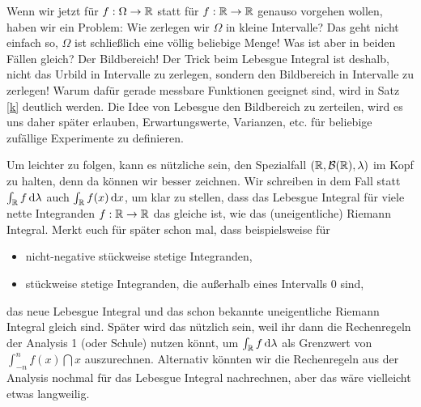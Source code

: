 Wenn wir jetzt f\"ur $f:\Omega\to \mathbb{R}$ statt für $f:\mathbb{R}\to \mathbb{R}$ genauso vorgehen wollen, haben wir ein Problem: Wie zerlegen wir $\Omega$ in kleine Intervalle? Das geht nicht einfach so, $\Omega$ ist schlie\ss lich eine v\"ollig beliebige Menge! Was ist aber in beiden F\"allen gleich? Der Bildbereich! Der Trick beim Lebesgue Integral ist deshalb, nicht das Urbild in Intervalle zu zerlegen, sondern den Bildbereich in Intervalle zu zerlegen! Warum daf\"ur gerade messbare Funktionen geeignet sind, wird in Satz \ref{k} deutlich werden. Die Idee von Lebesgue den Bildbereich zu zerteilen, wird es uns daher sp\"ater erlauben, Erwartungswerte, Varianzen, etc. f\"ur beliebige zuf\"allige Experimente zu definieren.\smallskip

Um leichter zu folgen, kann es n\"utzliche sein, den Spezialfall $(\mathbb{R}, \mathcal B(\mathbb{R}), \lambda)$ im Kopf zu halten, denn da k\"onnen wir besser zeichnen. Wir schreiben in dem Fall statt $\int_{\mathbb{R}} f \, \mathrm{d} \lambda$ auch $\int_{\mathbb{R}} f(x)\, \mathrm{d} x$, um klar zu stellen, dass das Lebesgue Integral f\"ur viele \glqq nette\grqq{} Integranden $f:\mathbb{R}\to\mathbb{R}$ das gleiche ist, wie das (uneigentliche) Riemann Integral. Merkt euch f\"ur sp\"ater schon mal, dass beispielsweise f\"ur 
\begin{itemize}
	\item nicht-negative st\"uckweise stetige Integranden,
	\item st\"uckweise stetige Integranden, die au\ss erhalb eines Intervalls $0$ sind,
\end{itemize}
das neue Lebesgue Integral und das schon bekannte uneigentliche Riemann Integral gleich sind. Sp\"ater wird das n\"utzlich sein, weil ihr dann die Rechenregeln der Analysis 1 (oder Schule) nutzen k\"onnt, um $\int_{\mathbb{R}} f\, \mathrm{d} \lambda$ als Grenzwert von $\int_{-n}^n f(x)\dint x$ auszurechnen. Alternativ k\"onnten wir die Rechenregeln aus der Analysis nochmal f\"ur das Lebesgue Integral nachrechnen, aber das w\"are vielleicht etwas langweilig.\smallskip

